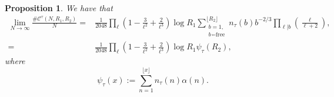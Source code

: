 \documentclass[table]{amsart}
\newtheorem{proposition}[theorem]{Proposition}
\newcommand{\cC}{\mathcal{C}}
\numberwithin{equation}{section}
\begin{document}
\begin{proposition}\label{main propn of article}
We have that
    \[\begin{split}\lim_{N\rightarrow \infty}\frac{\# \cC^\tau (N, R_1, R_2)}{N}=& \frac{1}{2048}\prod_\ell\left(1-\frac{3}{\ell^2}+\frac{2}{\ell^3}\right)\log R_1\sum_{\substack{b=1,\\
    b\,\square\text{-free}}}^{\lfloor R_2\rfloor}  n_\tau(b)b^{-2/3}\prod_{\ell|b}\left(\frac{\ell}{\ell+2}\right),\\ 
    =& \frac{1}{2048}\prod_{\ell}\left(1-\frac{3}{\ell^2}+\frac{2}{\ell^3}\right)\log R_1\psi_\tau(R_2),\end{split}\]
    where
    \[\psi_\tau(x):=\sum_{n=1}^{\lfloor x\rfloor} n_\tau(n)\alpha(n).\]

\end{proposition}
\end{document}
